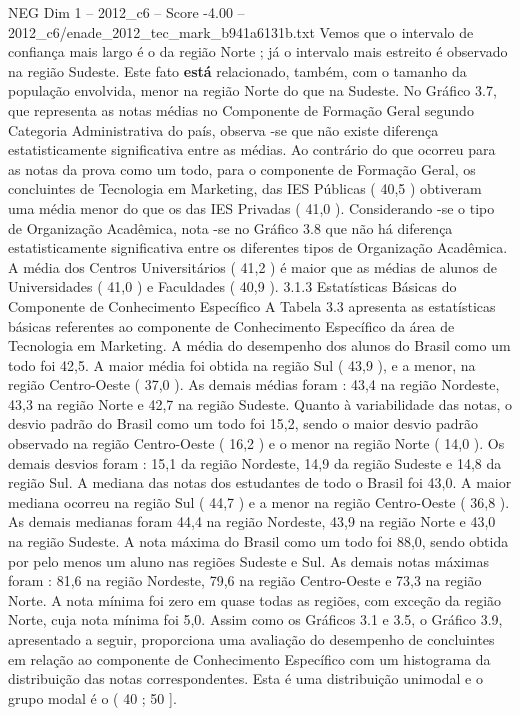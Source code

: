 \begin{textsample}{NEG Dim 1 – 2012\_c6 – Score -4.00 – 2012\_c6/enade\_2012\_tec\_mark\_b941a6131b.txt}
Vemos que o intervalo de confiança mais largo é o da região Norte ; já o intervalo mais estreito é observado na região Sudeste.
Este fato \textbf{está} relacionado, também, com o tamanho da população envolvida, menor na região Norte do que na Sudeste.
No Gráfico 3.7, que representa as notas médias no Componente de Formação Geral segundo Categoria Administrativa do país, observa -se que não existe diferença estatisticamente significativa entre as médias.
Ao contrário do que ocorreu para as notas da prova como um todo, para o componente de Formação Geral, os concluintes de Tecnologia em Marketing, das IES Públicas ( 40,5 ) obtiveram uma média menor do que os das IES Privadas ( 41,0 ).
Considerando -se o tipo de Organização Acadêmica, nota -se no Gráfico 3.8 que não há diferença estatisticamente significativa entre os diferentes tipos de Organização Acadêmica.
A média dos Centros Universitários ( 41,2 ) é maior que as médias de alunos de Universidades ( 41,0 ) e Faculdades ( 40,9 ). 3.1.3 Estatísticas Básicas do Componente de Conhecimento Específico A Tabela 3.3 apresenta as estatísticas básicas referentes ao componente de Conhecimento Específico da área de Tecnologia em Marketing.
A média do desempenho dos alunos do Brasil como um todo foi 42,5.
A maior média foi obtida na região Sul ( 43,9 ), e a menor, na região Centro-Oeste ( 37,0 ).
As demais médias foram : 43,4 na região Nordeste, 43,3 na região Norte e 42,7 na região Sudeste.
Quanto à variabilidade das notas, o desvio padrão do Brasil como um todo foi 15,2, sendo o maior desvio padrão observado na região Centro-Oeste ( 16,2 ) e o menor na região Norte ( 14,0 ).
Os demais desvios foram : 15,1 da região Nordeste, 14,9 da região Sudeste e 14,8 da região Sul.
A mediana das notas dos estudantes de todo o Brasil foi 43,0.
A maior mediana ocorreu na região Sul ( 44,7 ) e a menor na região Centro-Oeste ( 36,8 ).
As demais medianas foram 44,4 na região Nordeste, 43,9 na região Norte e 43,0 na região Sudeste.
A nota máxima do Brasil como um todo foi 88,0, sendo obtida por pelo menos um aluno nas regiões Sudeste e Sul.
As demais notas máximas foram : 81,6 na região Nordeste, 79,6 na região Centro-Oeste e 73,3 na região Norte.
A nota mínima foi zero em quase todas as regiões, com exceção da região Norte, cuja nota mínima foi 5,0.
Assim como os Gráficos 3.1 e 3.5, o Gráfico 3.9, apresentado a seguir, proporciona uma avaliação do desempenho de concluintes em relação ao componente de Conhecimento Específico com um histograma da distribuição das notas correspondentes.
Esta é uma distribuição unimodal e o grupo modal é o ( 40 ; 50 ].

\end{textsample}
